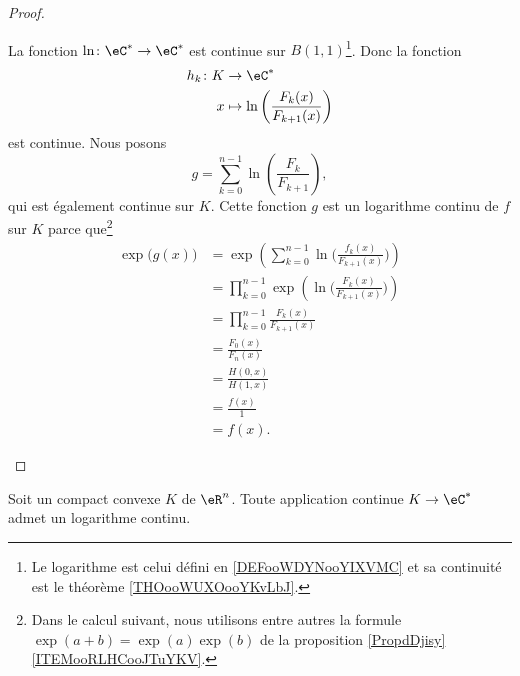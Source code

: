\begin{proof}
\begin{subproof}
		La fonction \( \ln\colon \eC^*\to \eC^*\) est continue sur \( B(1,1)\)\footnote{Le logarithme est celui défini en \ref{DEFooWDYNooYIXVMC} et sa continuité est le théorème \ref{THOooWUXOooYKvLbJ}.}. Donc la fonction
		\begin{equation}
			\begin{aligned}
				h_k\colon K & \to \eC^*                                               \\
				x           & \mapsto \ln\left( \frac{ F_k(x) }{ F_{k+1}(x) } \right)
			\end{aligned}
		\end{equation}
		est continue. Nous posons
		\begin{equation}
			g=\sum_{k=0}^{n-1}\ln\left( \frac{ F_k }{ F_{k+1} } \right),
		\end{equation}
		qui est également continue sur \( K\). Cette fonction \( g\) est un logarithme continu de \( f\) sur \( K\) parce que\footnote{Dans le calcul suivant, nous utilisons entre autres la formule \( \exp(a+b)=\exp(a)\exp(b)\) de la proposition \ref{PropdDjisy}\ref{ITEMooRLHCooJTuYKV}.}
		\begin{subequations}
			\begin{align}
				\exp\big( g(x) \big) & =\exp\left( \sum_{k=0}^{n-1} \ln\Big( \frac{ f_k(x) }{ F_{k+1}(x) } \Big) \right) \\
				                     & =\prod_{k=0}^{n-1}\exp\left( \ln\big( \frac{ F_k(x) }{ F_{k+1}(x) } \big) \right) \\
				                     & =\prod_{k=0}^{n-1}\frac{ F_k(x) }{ F_{k+1}(x) }                                   \\
				                     & =\frac{ F_0(x) }{ F_n(x) }                                                        \\
				                     & =\frac{ H(0,x) }{ H(1,x) }                                                        \\
				                     & =\frac{ f(x) }{ 1 }                                                               \\
				                     & =f(x).
			\end{align}
		\end{subequations}
	\end{subproof}
\end{proof}

\begin{corollary}     \label{CORooXOOZooUJMKxu}
	Soit un compact convexe \( K\) de \( \eR^n\). Toute application continue \( K\to \eC^*\) admet un logarithme continu.
\end{corollary}

